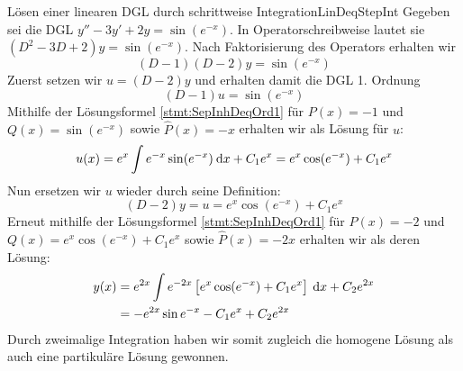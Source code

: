 \begin{example}{Lösen einer linearen DGL durch schrittweise Integration}{LinDeqStepInt}
    Gegeben sei die DGL $y''-3y'+2y=\sin(e^{-x})$. In Operatorschreibweise lautet sie $(D^2-3D+2)y = \sin(e^{-x})$. Nach Faktorisierung des Operators erhalten wir
    $$
        (D-1)(D-2) y = \sin(e^{-x})
    $$
    Zuerst setzen wir $u = (D-2)y$ und erhalten damit die DGL 1. Ordnung
    $$
        (D-1)u = \sin(e^{-x})
    $$
    Mithilfe der Lösungsformel \ref{stmt:SepInhDeqOrd1} für $P(x) = -1$ und $Q(x) = \sin(e^{-x})$ sowie $\hat{P}(x) = -x$ erhalten wir als Lösung für $u$:
    $$
        u(x) = e^x\int e^{-x} \sin(e^{-x}) \:\mathrm{d}{x} + C_1 e^x = e^x\cos(e^{-x}) + C_1 e^x
    $$
    Nun ersetzen wir $u$ wieder durch seine Definition:
    $$
        (D-2)y = u = e^x\cos(e^{-x}) + C_1 e^x
    $$
    Erneut mithilfe der Lösungsformel \ref{stmt:SepInhDeqOrd1} für $P(x) = -2$ und $Q(x) = e^x\cos(e^{-x}) + C_1 e^x$ sowie $\hat{P}(x) = -2x$ erhalten wir als deren Lösung:
    \begin{alignat*}{1}
        y(x) &= e^{2x} \int e^{-2x} \left[ e^x \cos(e^{-x}) + C_1 e^x \right] \:\mathrm{d}{x} + C_2 e^{2x} \\
             &= -e^{2x} \sin{e^{-x}} -C_1 e^x + C_2 e^{2x}
    \end{alignat*}
    Durch zweimalige Integration haben wir somit zugleich die homogene Lösung als auch eine partikuläre Lösung gewonnen.
\end{example}